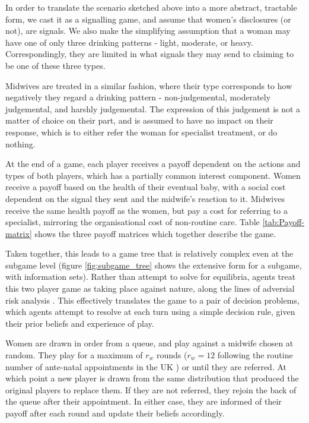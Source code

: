 In order to translate the scenario sketched above into a more abstract, tractable form, we cast it as a signalling game, and assume that women's disclosures (or not), are signals. We also make the simplifying assumption that a woman may have one of only three drinking patterns - light, moderate, or heavy. Correspondingly, they are limited in what signals they may send to claiming to be one of these three types.

Midwives are treated in a similar fashion, where their type corresponds to how negatively they regard a drinking pattern - non-judgemental, moderately judgemental, and harshly judgemental. The expression of this judgement is not a matter of choice on their part, and is assumed to have no impact on their response, which is to either refer the woman for specialist treatment, or do nothing.

At the end of a game, each player receives a payoff dependent on the actions and types of both players, which has a partially common interest component. Women receive a payoff based on the health of their eventual baby, with a social cost dependent on the signal they sent and the midwife's reaction to it. Midwives receive the same health payoff as the women, but pay a cost for referring to a specialist, mirroring the organisational cost of non-routine care. Table \ref{tab:Payoff-matrix} shows the three payoff matrices which together describe the game.

Taken together, this leads to a game tree that is relatively complex even at the subgame level (figure \ref{fig:subgame_tree} shows the extensive form for a subgame, with information sets). 
Rather than attempt to solve for equilibria, agents treat this two player game as taking place against nature, along the lines of adversial risk analysis \citep{RiosInsua2009}. This effectively translates the game to a pair of decision problems, which agents attempt to resolve at each turn using a simple decision rule, given their prior beliefs and experience of play.

Women are drawn in order from a queue, and play against a midwife chosen at random. They play for a maximum of \(r_{w}\) rounds (\(r_{w}=12\) following the routine number of ante-natal appointments in the UK \citep{NICE2010a}) or until they are referred. At which point a new player is drawn from the same distribution that produced the original players to replace them. If they are not referred, they rejoin the back of the queue after their appointment. In either case, they are informed of their payoff after each round and update their beliefs accordingly.

